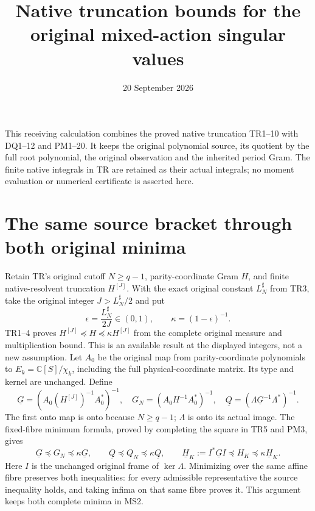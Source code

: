 \documentclass[11pt]{article}
\title{Native truncation bounds for the original mixed-action singular values}
\author{}
\date{20 September 2026}
\begin{document}
\maketitle
This receiving calculation combines the proved native truncation
TR1--10 with DQ1--12 and PM1--20. It keeps the original polynomial
source, its quotient by the full root polynomial, the original
observation and the inherited period Gram. The finite native
integrals in TR are retained as their actual integrals; no moment
evaluation or numerical certificate is asserted here.

\section{The same source bracket through both original minima}
Retain TR's original cutoff $N\ge q-1$, parity-coordinate Gram $H$,
and finite native-resolvent truncation $H^{[J]}$. With the exact
original constant $L_N^\sharp$ from TR3, take the original integer
$J>L_N^\sharp/2$ and put
\[
 \epsilon=\frac{L_N^\sharp}{2J}\in(0,1),\qquad
 \kappa=(1-\epsilon)^{-1}.
 \tag{MS1}
\]
TR1--4 proves $H^{[J]}\preceq H\preceq\kappa H^{[J]}$ from
the complete original measure and multiplication bound. This is an
available result at the displayed integers, not a new assumption.
Let $A_0$ be the original map from parity-coordinate polynomials to
$E_k=\mathbb C[S]/\chi_k$, including the full physical-coordinate
matrix. Its type and kernel are unchanged. Define
\[
 \underline G=(A_0(H^{[J]})^{-1}A_0^*)^{-1},\quad
 G_N=(A_0H^{-1}A_0^*)^{-1},\quad
 \underline Q=(\Lambda\underline G^{-1}\Lambda^*)^{-1}.
 \tag{MS2}
\]
The first onto map is onto because $N\ge q-1$; $\Lambda$ is onto
its actual image. The fixed-fibre minimum formula, proved by
completing the square in TR5 and PM3, gives
\[
 \underline G\preceq G_N\preceq\kappa\underline G,\qquad
 \underline Q\preceq Q_N\preceq\kappa\underline Q,\qquad
 \underline H_K:=I^*\underline GI\preceq H_K
                           \preceq\kappa\underline H_K.
 \tag{MS3}
\]
Here $I$ is the unchanged original frame of $\ker\Lambda$.
Minimizing over the same affine fibre preserves both inequalities:
for every admissible representative the source inequality holds,
and taking infima on that same fibre proves it. This argument
keeps both complete minima in MS2.
\end{document}
